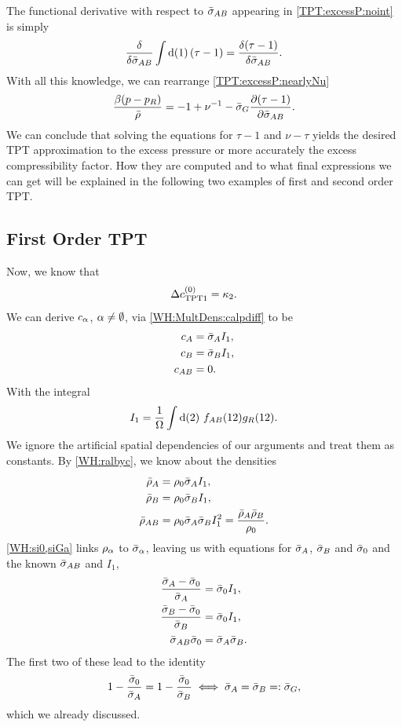 \documentclass[8.5pt,twoside,twocolumn]{article}
\newcommand\di{\te{d}}
\newcommand\inon{\enmat{\int\di(1)}}
\newcommand\fab{\enmat{f_{AB}}}
\newcommand\roz{\enmat{\rho_0}}
\newcommand\ral{\enmat{\rho_{\al}}}
\newcommand\calp{\enmat{c_{\al}}}
\newcommand\sal{\enmat{\si_{\al}}}
\theoremstyle{standard}
\begin{document}
The functional derivative with respect to $\bar\sigma_{AB}$ appearing in \eqref{TPT:excessP:noint}
is simply 
\begin{equation}
\delti{}{\siab}\inon\rb{\tau-1}=\delti{\rb{\tau-1}}{\siab}.
\end{equation}
With all this knowledge, we can rearrange \eqref{TPT:excessP:nearlyNu}
\begin{equation}
\frac{\beta(p-p_R)}{\bar\rho}=-1+\nu^{-1}-\bar\sigma_G\frac {\partial{\left({\tau-1}\right)}} {\partial{\bar\sigma_{AB}}}.
\label{TPT:excessP:final}
\end{equation}
We can conclude that solving the equations for $\tau-1$ and $\nu - \tau$ yields
the desired TPT approximation to the excess pressure or more accurately the
excess compressibility factor. How they are computed and to what final expressions
we can get will be explained in the following two examples of first and second order
TPT.

\subsection{First Order TPT}
\newcommand\toc{\dc_{\te{TPT1}}}
Now, we know that
\begin{equation}
\toc=\kt.
\end{equation}
We can derive $\calp$, $\alpha\neq\emptyset$, via \eqref{WH:MultDens:calpdiff} to
be
\begin{equation}
\begin{aligned}
c_A&=\bar\sigma_A I_1, \\
c_B&=\bar\sigma_B I_1, \\
c_{AB}&=0.
\end{aligned}
\end{equation}
With the integral
\begin{equation}
I_1=\frac 1 \Om \int\di(2)\ \fab(12)g_R(12).
\end{equation}
We ignore the artificial spatial dependencies of our arguments and treat
them as constants. By \eqref{WH:ralbyc}, we know about the densities
\begin{equation}
\begin{aligned}
\tr_A&=\roz\si_A I_1, \\
\tr_B&=\roz\si_B I_1, \\
\tr_{AB}&=\roz\si_A\si_B I_1^2=\frac {\tr_A\tr_B}{\roz}.
\end{aligned}
\end{equation}
\eqref{WH:si0,siGa} links $\ral$ to $\sal$, leaving us with equations for
$\bar\sigma_A$, $\bar\sigma_B$ and $\bar\sigma_0$ and the known $\bar\sigma_{AB}$ and $I_1$,
\begin{equation}
\begin{aligned}
\frac{\bar\sigma_A-\bar\sigma_0}{\bar\sigma_A}&=\bar\sigma_0 I_1,\\
\frac{\bar\sigma_B-\bar\sigma_0}{\bar\sigma_B}&=\bar\sigma_0 I_1,\\
\bar\sigma_{AB}\bar\sigma_0&=\bar\sigma_A\bar\sigma_B.
\end{aligned}
\label{TPT1:sigmas}
\end{equation}
The first two of these lead to the identity
\begin{equation}
1-\frac{\bar\sigma_0}{\bar\sigma_A}=1-\frac{\bar\sigma_0}{\bar\sigma_B} \iff \bar\sigma_A=\bar\sigma_B=:\bar\sigma_G,
\end{equation}
which we already discussed.
\end{document}
